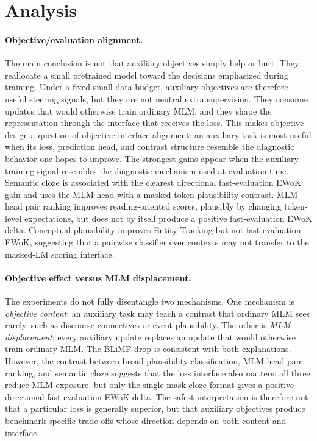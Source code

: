 \documentclass[11pt]{article}
\begin{document}
\section{Analysis}

\paragraph{Objective/evaluation alignment.}
The main conclusion is not that auxiliary objectives simply help or hurt.
They reallocate a small pretrained model toward the decisions emphasized during training.
Under a fixed small-data budget, auxiliary objectives are therefore useful steering signals, but they are not neutral extra supervision.
They consume updates that would otherwise train ordinary MLM, and they shape the representation through the interface that receives the loss.
This makes objective design a question of objective-interface alignment: an auxiliary task is most useful when its loss, prediction head, and contrast structure resemble the diagnostic behavior one hopes to improve.
The strongest gains appear when the auxiliary training signal resembles the diagnostic mechanism used at evaluation time.
Semantic cloze is associated with the clearest directional fast-evaluation EWoK gain and uses the MLM head with a masked-token plausibility contrast.
MLM-head pair ranking improves reading-oriented scores, plausibly by changing token-level expectations, but does not by itself produce a positive fast-evaluation EWoK delta.
Conceptual plausibility improves Entity Tracking but not fast-evaluation EWoK, suggesting that a pairwise classifier over contexts may not transfer to the masked-LM scoring interface.

\paragraph{Objective effect versus MLM displacement.}
The experiments do not fully disentangle two mechanisms.
One mechanism is \textit{objective content}: an auxiliary task may teach a contrast that ordinary MLM sees rarely, such as discourse connectives or event plausibility.
The other is \textit{MLM displacement}: every auxiliary update replaces an update that would otherwise train ordinary MLM.
The BLiMP drop is consistent with both explanations.
However, the contrast between broad plausibility classification, MLM-head pair ranking, and semantic cloze suggests that the loss interface also matters: all three reduce MLM exposure, but only the single-mask cloze format gives a positive directional fast-evaluation EWoK delta.
The safest interpretation is therefore not that a particular loss is generally superior, but that auxiliary objectives produce benchmark-specific trade-offs whose direction depends on both content and interface.
\end{document}
